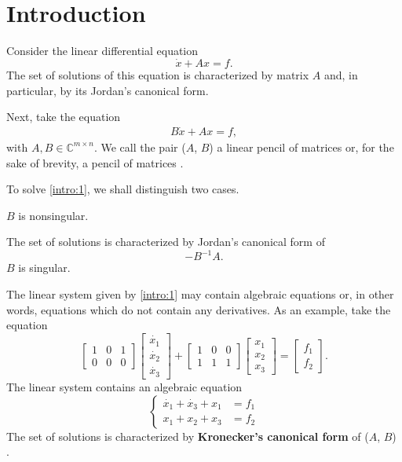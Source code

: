 \section{Introduction}
Consider the linear differential equation
\[
	\dot{x} + Ax = f.
\]
The set of solutions of this equation is characterized by matrix $A$ and, in particular, by its Jordan's canonical form.

Next, take the equation
\begin{gather} \label{intro:1}
	B\dot{x} + Ax = f,
\end{gather}
with $A, B \in \mathbb{C}^{m \times n}$. We call the pair ($A$, $B$) a linear pencil of matrices or, for the sake of brevity,
a pencil of matrices \cite{ikramov}.

To solve \eqref{intro:1}, we shall distinguish two cases.
\begin{cs}
	\case $B$ is nonsingular.

		The set of solutions is characterized by Jordan's canonical form of \[-B^{-1}A.\]
	\case $B$ is singular.

		The linear system given by \eqref{intro:1} may contain algebraic equations or, in other words, equations which do
		not contain any derivatives. As an example, take the equation
		\[
			\begin{bmatrix}
				1 & 0 & 1 \\
				0 & 0 & 0
			\end{bmatrix}
			\begin{bmatrix}
				\dot{x_1} \\
				\dot{x_2} \\
				\dot{x_3}
			\end{bmatrix} + 
			\begin{bmatrix}
				1 & 0 & 0 \\
				1 & 1 & 1
			\end{bmatrix}
			\begin{bmatrix}
				x_1 \\
				x_2 \\
				x_3
			\end{bmatrix}
			= \begin{bmatrix}
				f_1 \\
				f_2
			\end{bmatrix}.
		\]
		The linear system contains an algebraic equation
		\begin{equation*}
			\left\{
				\begin{aligned}
					\dot{x_1} + \dot{x_3} + x_1 &= f_1 \\
					x_1 + x_2 + x_3 &= f_2
				\end{aligned}
			\right.
		\end{equation*}
		The set of solutions is characterized by \textbf{Kronecker's canonical form} of ($A$, $B$)
		\cite{gantmacher, kunkel-mehrmann}.
\end{cs}


